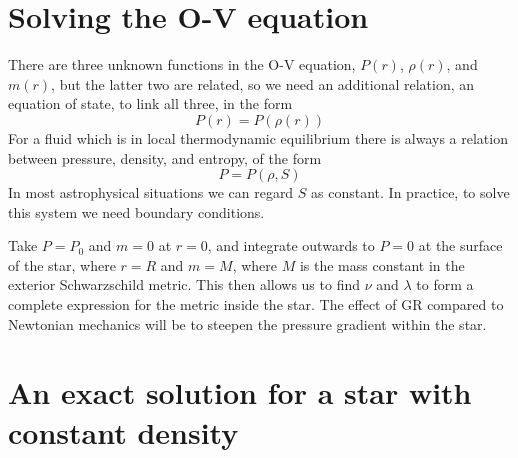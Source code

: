 \section{Solving the O-V equation}
\label{sec:solv-oppenh-volk}

There are three unknown functions in the O-V equation, $P(r)$,
$\rho(r)$, and $m(r)$, but the latter two are related, so we need an
additional relation, an equation of state, to link all three, in the form
\[ P(r) = P(\rho(r)) \]
For a fluid which is in local thermodynamic equilibrium there is always a relation between pressure, density, and entropy, of the form
\[ P=P(\rho,S) \] In most astrophysical situations we can regard $S$
as constant. In practice, to solve this system we need boundary
conditions.

Take $P=P_0$ and $m=0$ at $r=0$, and integrate outwards to $P=0$ at
the surface of the star, where $r=R$ and $m=M$, where $M$ is the mass
constant in the exterior Schwarzschild metric. This then allows us to
find $\nu$ and $\lambda$ to form a complete expression for the metric
inside the star. The effect of GR compared to Newtonian mechanics will
be to steepen the pressure gradient within the star.

\section[Constant density star solution]{An exact solution for a star with constant density}
\label{sec:an-exact-solution}

